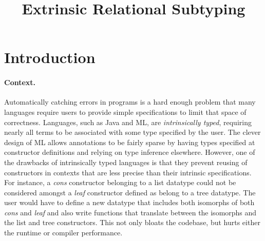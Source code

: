 \documentclass[acmsmall]{acmart}
\title{Extrinsic Relational Subtyping}
\theoremstyle{definition}
\begin{document}
\newcommand{\obj}[1]{\texttt{\color{RoyalBlue} #1}}
\newcommand{\entails}{\vdash}
\newcommand{\satisfies}{\vDash}
\newcommand{\given}{\dashv}


\newcommand{\multi}[1]{\widebar{\ #1\ }}
\newcommand{\hastype}{:}
\newcommand{\pattype}{\ \lozenge\ }
\newcommand{\liftfun}{\ \blacktriangle\ }
 
\newcommand{\subtypes}{<:}
\newcommand{\I}{\hspace{4mm}}
\newcommand{\Z}{.\hspace{4mm}}
\newcommand{\Alpha}{\mathrm{A}}
\newcommand{\Tau}{\mathrm{T}}
\newcommand{\B}[1]{\textbf{#1}}
\newcommand{\F}[1]{\text{#1}}
\newcommand{\bigand}{\bigwedge\nolimits}
\newcommand{\bigor}{\bigvee\nolimits}
\newcommand{\C}[1]{\color{teal} \rhd\ \emph{#1}}
\newcommand{\D}[1]{\small \textsc{#1}}
\newcommand{\FIG}[1]{Fig. {\color{red} \ref{#1}}}
\newcommand{\TODO}[1]{\noindent \B{\color{red} TODO: #1}}

\newcommand{\is}{\ ::=\ }
\newcommand{\sep}{\ \ |\ \ }
\newcommand{\nonterm}[1]{#1\ }
\newcommand{\contin}{|\ \ \ \ \ \ \ }
\newcommand{\case}{\B{case }}
\newcommand{\wrt}{\B{wrt }}
     



\maketitle


\section{Introduction}

\paragraph{Context.} 

Automatically catching errors in programs is a hard enough problem
that many languages require users to provide simple specifications to limit that space of correctness.
Languages, such as Java and ML, are \textit{intrinsically typed}, 
requiring nearly all terms to be associated with some type specified by the user. 
The clever design of ML allows annotations to be fairly sparse by 
having types specified at constructor definitions and relying on type inference elsewhere.
However, one of the drawbacks of intrinsically typed languages is that they prevent reusing of
constructors in contexts that are less precise than their intrinsic specifications. For instance,
a \emph{cons} constructor belonging to a list datatype could not be considered amongst a \emph{leaf} constructor
defined as belong to a tree datatype. The user would have to define a new datatype that includes both isomorphs of both \emph{cons}
and \emph{leaf} and also write functions that translate between the isomorphs and the list and tree constructors. 
This not only bloats the codebase, but hurts either the runtime or compiler performance.
\end{document}
